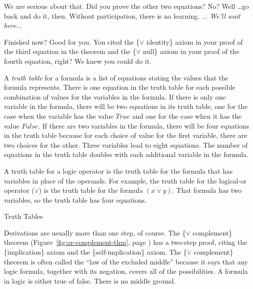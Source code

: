 We are serious about that. Did you prove the other two equations?
No? Well \dots go back and do it, then. Without participation, there
is no learning. $\dots$ \emph{We'll wait here}$\dots$

Finished now? Good for you. You cited the \{$\vee$ identity\} axiom in your
proof of the third equation in the theorem and the \{$\vee$ null\}
axiom in your proof of the fourth equation, right? We knew you could do it.

\begin{aside}
A \emph{truth table} for a formula is a list of equations
stating the values that the formula represents.
There is one equation in the truth table for each possible
combination of values for the variables in the formula.
If there is only one variable in the formula,
there will be two equations in its truth table,
one for the case when the variable has the value
$True$ and one for the case when it has the value $False$.
If there are two variables in the formula,
there will be four equations in the truth table
because for each choice of value for the first variable,
there are two choices for the other.
Three variables lead to eight equations.
The number of equations in the truth table
doubles with each additional variable
in the formula.

A truth table for a logic operator is the truth table for the formula
that has variables in place of the operands.
For example, the truth table for the logical-or operator ($\vee$)
is the truth table for the formula $(x \vee y)$.
That formula has two variables, so the truth table has four equations.
\caption{Truth Tables}
\label{truth-tables}
\end{aside}

Derivations are usually more than one step, of course.
The \{$\vee$ complement\} theorem
(Figure~\ref{fig:or-complement-thm}, page \pageref{fig:or-complement-thm})
has a two-step proof, citing the \{implication\} axiom
and the \{self-implication\} axiom.
The \{$\vee$ complement\} theorem is often called the
``law of the excluded middle''
because it says that any logic formula,
together with its negation, covers all of the possibilities.
A formula in logic is either true of false.
There is no middle ground.

